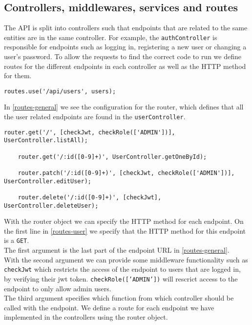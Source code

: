 \subsection{Controllers, middlewares, services and routes}\label{subsec:controllers}

The API is split into controllers such that endpoints that are related to the same entities are in the same controller. 
For example, the \texttt{authController} is responsible for endpoints such as logging in, registering a new user or changing a user's password.
To allow the requests to find the correct code to run we define routes for the different endpoints in each controller as well as the HTTP method for them.

\begin{lstlisting}[caption={The route used for all user related endpoints}, captionpos=b, label={routes-general}]
    routes.use('/api/users', users);
\end{lstlisting}
In \autoref{routes-general} we see the configuration for the router, which defines that all the user related endpoints are found in the \texttt{userController}.
\begin{lstlisting}[caption={Some of the routes for the different user endpoints}, captionpos=b, label={routes-user}]
    router.get('/', [checkJwt, checkRole(['ADMIN'])], UserController.listAll);

    router.get('/:id([0-9]+)', UserController.getOneById);

    router.patch('/:id([0-9]+)', [checkJwt, checkRole(['ADMIN'])], UserController.editUser);

    router.delete('/:id([0-9]+)', [checkJwt], UserController.deleteUser);
\end{lstlisting}
With the router object we can specify the HTTP method for each endpoint. 
On the first line in \autoref{routes-user} we specify that the HTTP method for this endpoint is a \texttt{GET}.
\\
The first argument is the last part of the endpoint URL in \autoref{routes-general}. 
\\
With the second argument we can provide some middleware functionality such as \texttt{checkJwt} which restricts the access of the endpoint to users that are logged in, by verifying their jwt token.
\texttt{checkRole(['ADMIN'])} will rescrict access to the endpoint to only allow admin users. 
\\
The third argument specifies which function from which controller should be called with the endpoint.
We define a route for each endpoint we have implemented in the controllers using the router object.

